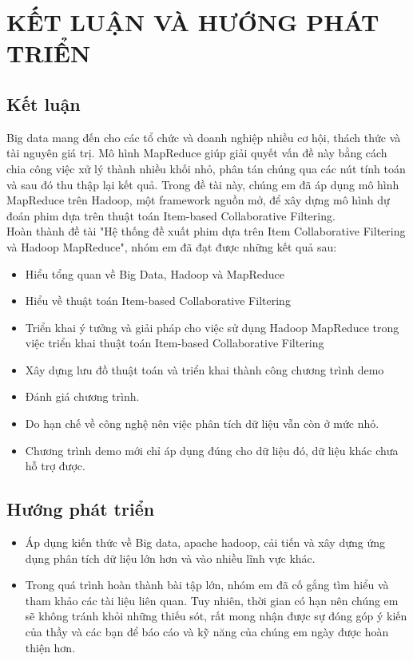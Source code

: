 \chapter[KẾT LUẬN VÀ HƯỚNG PHÁT TRIỂN]
 {\LARGE KẾT LUẬN VÀ HƯỚNG PHÁT TRIỂN}

\section{Kết luận}
Big data mang đến cho các tổ chức và doanh nghiệp nhiều cơ hội, thách thức và tài nguyên
giá trị. Mô hình MapReduce giúp giải quyết vấn đề này bằng cách chia công việc xử lý thành
nhiều khối nhỏ, phân tán chúng qua các nút tính toán và sau đó thu thập lại kết quả.
Trong đề tài này, chúng em đã áp dụng mô hình MapReduce trên Hadoop, một framework nguồn mở,
để xây dựng mô hình dự đoán phim dựa trên thuật toán Item-based Collaborative Filtering. \\
\vspace{0.5cm}
Hoàn thành đề tài "Hệ thống đề xuất phim dựa trên Item Collaborative Filtering và Hadoop MapReduce",
nhóm em đã đạt được những kết quả sau:
\begin{itemize}
    \item Hiểu tổng quan về Big Data, Hadoop và MapReduce
    \item Hiểu về thuật toán Item-based Collaborative Filtering
    \item Triển khai ý tưởng và giải pháp cho việc sử dụng Hadoop MapReduce
          trong việc triển khai thuật toán Item-based Collaborative Filtering
    \item Xây dựng lưu đồ thuật toán và triển khai thành công chương trình demo
    \item Đánh giá chương trình.
    \item Do hạn chế về công nghệ nên việc phân tích dữ liệu vẫn còn ở mức nhỏ.
    \item Chương trình demo mới chỉ áp dụng đúng cho dữ liệu đó, dữ liệu khác chưa hỗ trợ được.
\end{itemize}

\section{Hướng phát triển}
\begin{itemize}
    \item Áp dụng kiến thức về Big data, apache hadoop, cải tiến và xây dựng ứng dụng phân tích
          dữ liệu lớn hơn và vào nhiều lĩnh vực khác.
    \item Trong quá trình hoàn thành bài tập lớn, nhóm em đã cố gắng tìm hiểu và tham khảo các
          tài liệu liên quan. Tuy nhiên, thời gian có hạn nên chúng em sẽ không tránh khỏi những
          thiếu sót, rất mong nhận được sự đóng góp ý kiến của thầy và các bạn để báo cáo và kỹ năng
          của chúng em ngày được hoàn thiện hơn.
\end{itemize}